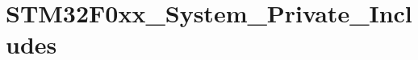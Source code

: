 \hypertarget{group___s_t_m32_f0xx___system___private___includes}{}\section{S\+T\+M32\+F0xx\+\_\+\+System\+\_\+\+Private\+\_\+\+Includes}
\label{group___s_t_m32_f0xx___system___private___includes}
